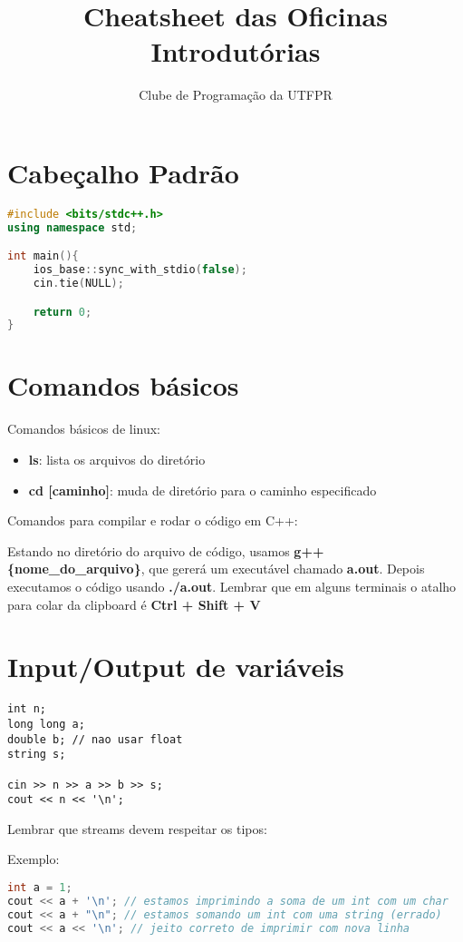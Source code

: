 \documentclass{article}
\title{Cheatsheet das Oficinas Introdutórias}
\author{Clube de Programação da UTFPR}
\begin{document}
\maketitle
\tableofcontents

\section{Cabeçalho Padrão}
\begin{lstlisting}[language=C++]
#include <bits/stdc++.h>
using namespace std;

int main(){
    ios_base::sync_with_stdio(false);
    cin.tie(NULL);

    return 0;
}
\end{lstlisting}

\section{Comandos básicos}
Comandos básicos de linux: 
\begin{itemize}
    \item \textbf{ls}: lista os arquivos do diretório
    \item \textbf{cd [caminho]}: muda de diretório para o caminho especificado
\end{itemize}

Comandos para compilar e rodar o código em C++:

Estando no diretório do arquivo de código, usamos \textbf{g++ \{nome\_do\_arquivo\}}, que gererá um executável chamado \textbf{a.out}.
Depois executamos o código usando \textbf{./a.out}.
Lembrar que em alguns terminais o atalho para colar da clipboard é \textbf{Ctrl + Shift + V}

\section{Input/Output de variáveis}
\begin{lstlisting}
int n;
long long a;
double b; // nao usar float
string s;

cin >> n >> a >> b >> s;
cout << n << '\n';
\end{lstlisting}
Lembrar que streams devem respeitar os tipos:

Exemplo:
\begin{lstlisting}[language=C++]
int a = 1;
cout << a + '\n'; // estamos imprimindo a soma de um int com um char
cout << a + "\n"; // estamos somando um int com uma string (errado)
cout << a << '\n'; // jeito correto de imprimir com nova linha
\end{lstlisting}
\end{document}
